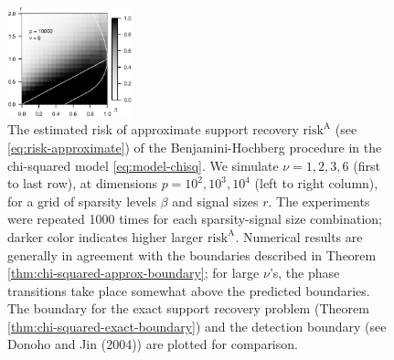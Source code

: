 \begin{figure}
      \includegraphics[width=0.32\textwidth]{sim_weak_boundary/simulated_weak_boundary_chi-squared_nu6_p10000.eps}
      \caption{The estimated risk of approximate support recovery $\mathrm{risk}^{\mathrm{A}}$ (see \eqref{eq:risk-approximate}) of the Benjamini-Hochberg procedure in the chi-squared model \eqref{eq:model-chisq}. 
      We simulate $\nu=1, 2, 3, 6$ (first to last row), at dimensions $p=10^2, 10^3, 10^4$ (left to right column), for a grid of sparsity levels $\beta$ and signal sizes $r$.
      The experiments were repeated 1000 times for each sparsity-signal size combination; darker color indicates higher larger $\mathrm{risk}^{\mathrm{A}}$. 
      Numerical results are generally in agreement with the boundaries described in Theorem \ref{thm:chi-squared-approx-boundary}; for large $\nu$'s, the phase transitions take place somewhat above the predicted boundaries.
      The boundary for the exact support recovery problem (Theorem \ref{thm:chi-squared-exact-boundary}) and the detection boundary (see Donoho and Jin (2004)) are plotted for comparison.} 
      \label{fig:phase-simulated-chi-squared-approx-boundary}
\end{figure}


